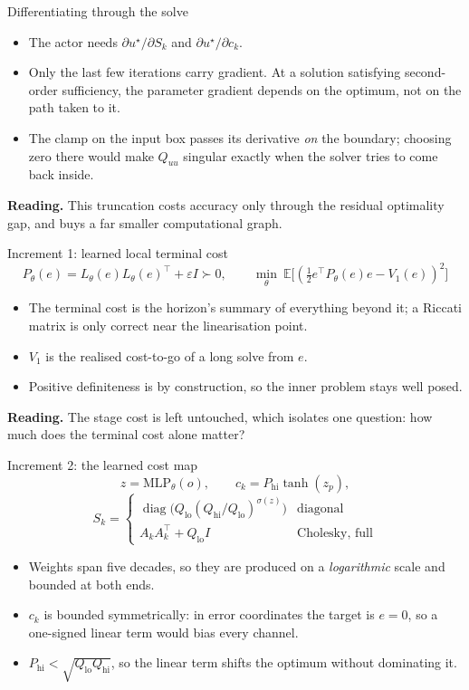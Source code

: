 \documentclass[10pt]{beamer}
\newcommand{\takeaway}[1]{\par\vfill{\footnotesize\textbf{Reading.} #1\par}}
\begin{document}
\begin{frame}{Differentiating through the solve}
  \begin{itemize}
    \item The actor needs $\partial u^{\star}/\partial S_k$ and
      $\partial u^{\star}/\partial c_k$.
    \item Only the last few iterations carry gradient. At a solution
      satisfying second-order sufficiency, the parameter gradient depends on
      the optimum, not on the path taken to it.
    \item The clamp on the input box passes its derivative \emph{on} the
      boundary; choosing zero there would make $Q_{uu}$ singular exactly when
      the solver tries to come back inside.
  \end{itemize}
  \takeaway{This truncation costs accuracy only through the residual
    optimality gap, and buys a far smaller computational graph.}
\end{frame}

\begin{frame}{Increment 1: learned local terminal cost}
  \[
    P_\theta(e)=L_\theta(e)L_\theta(e)^{\!\top}+\varepsilon I\succ0,
    \qquad
    \min_\theta\ \mathbb{E}\big[(\tfrac12 e^{\!\top}P_\theta(e)e-V_1(e))^{2}\big]
  \]
  \begin{itemize}
    \item The terminal cost is the horizon's summary of everything beyond it;
      a Riccati matrix is only correct near the linearisation point.
    \item $V_1$ is the realised cost-to-go of a long solve from $e$.
    \item Positive definiteness is by construction, so the inner problem stays
      well posed.
  \end{itemize}
  \takeaway{The stage cost is left untouched, which isolates one question:
    how much does the terminal cost alone matter?}
\end{frame}

\begin{frame}{Increment 2: the learned cost map}
  {\small
  \[
    z=\mathrm{MLP}_\theta(o),
    \qquad
    c_k=P_{\mathrm{hi}}\tanh(z_p),
  \]
  \[
    S_k=\begin{cases}
      \operatorname{diag}\big(Q_{\mathrm{lo}}
        (Q_{\mathrm{hi}}/Q_{\mathrm{lo}})^{\sigma(z)}\big)
        & \text{diagonal}\\[2pt]
      A_kA_k^{\!\top}+Q_{\mathrm{lo}}I & \text{Cholesky, full}
    \end{cases}
  \]}
  \begin{itemize}
    \item Weights span five decades, so they are produced on a
      \emph{logarithmic} scale and bounded at both ends.
    \item $c_k$ is bounded symmetrically: in error coordinates the target is
      $e=0$, so a one-signed linear term would bias every channel.
    \item $P_{\mathrm{hi}}<\sqrt{Q_{\mathrm{lo}}Q_{\mathrm{hi}}}$, so the
      linear term shifts the optimum without dominating it.
  \end{itemize}
\end{frame}
\end{document}
